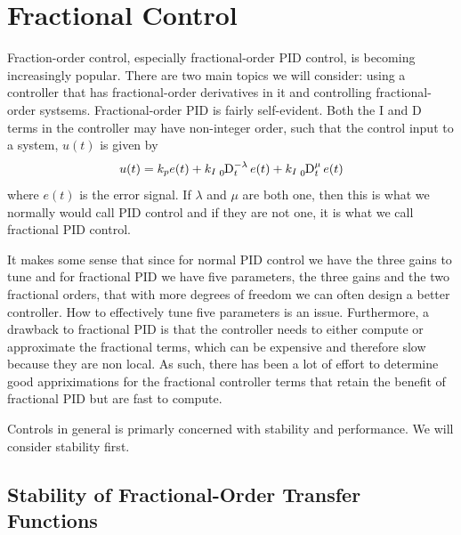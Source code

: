 \chapter{Fractional Control}

Fraction-order control, especially fractional-order PID control, is becoming increasingly popular. There are two main topics we will consider: using a controller that has fractional-order derivatives in it and controlling fractional-order systsems. Fractional-order PID is fairly self-evident. Both the I and D terms in the controller may have non-integer order, such that the control input to a system, $u(t)$ is given by
\begin{equation*}
  u(t) = k_p e(t) + k_I \tensor*[_0]\D{^{-\lambda}_t} e(t) + k_I \tensor*[_0]\D{^{\mu}_t} e(t)
\end{equation*}
where $e(t)$ is the error signal. If $\lambda$ and $\mu$ are both one, then this is what we normally would call PID control and if they are not one, it is what we call fractional PID control. 

It makes some sense that since for normal PID control we have the three gains to tune and for fractional PID we have five parameters, the three gains and the two fractional orders, that with more degrees of freedom we can often design a better controller. How to effectively tune five parameters is an issue. Furthermore, a drawback to fractional PID is that the controller needs to either compute or approximate the fractional terms, which can be expensive and therefore slow because they are non local. As such, there has been a lot of effort to determine good appriximations for the fractional controller terms that retain the benefit of fractional PID but are fast to compute.

Controls in general is primarly concerned with stability and performance. We will consider stability first.

\section{Stability of Fractional-Order Transfer Functions}

